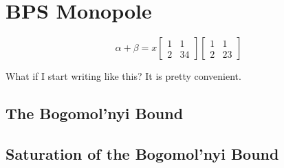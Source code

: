 \documentclass[main.tex]{subfiles}
\begin{document}
\section{BPS Monopole}

\begin{equation}
    \alpha + \beta = x \left[\begin{array}{cc}
    1 & 1 \\ 
    2 & 34
    \end{array}\right]
    \begin{bmatrix}
        1&1\\
        2& 23
    \end{bmatrix}
\end{equation}

What if I start writing like this? It is pretty convenient.

\subsection{The Bogomol'nyi Bound}
\subsection{Saturation of the Bogomol'nyi Bound}
\end{document}
